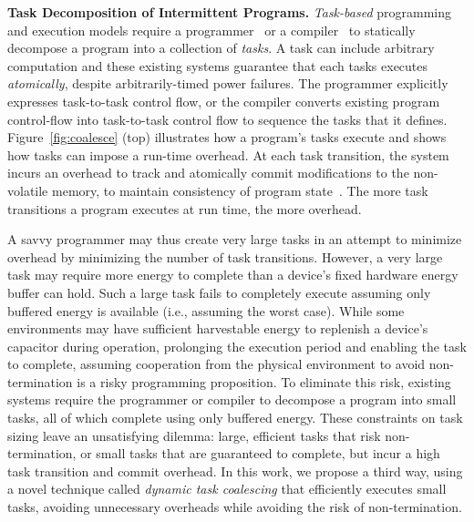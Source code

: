 \textbf{Task Decomposition of Intermittent Programs.} {\em
Task-based} programming and execution models require a
programmer~\citep{alpaca,chain} or a compiler~\cite{baghsorkhi_cgo_2018} to
statically decompose a program into a collection of {\em tasks}.  A task can
include arbitrary computation and these existing systems guarantee that each
tasks executes {\em atomically}, despite arbitrarily-timed power failures.  
%
The programmer explicitly expresses task-to-task control flow, or the compiler
converts existing program control-flow into task-to-task control flow to sequence 
the tasks that it defines.
%
Figure~\ref{fig:coalesce} (top) illustrates how a program's tasks execute and
shows how tasks can impose a run-time overhead. 
%
At each task transition, the system incurs an overhead to track and atomically
commit modifications to the non-volatile memory, to maintain consistency of
program state~\citep{chain,alpaca}.  
%
The more task transitions a program executes at run time, the more overhead.

A savvy programmer may thus create very large tasks in an attempt to minimize
overhead by minimizing the number of task transitions.  However, a very large
task may require more energy to complete than a device's fixed hardware energy
buffer can hold.  Such a large task fails to completely execute assuming only
buffered energy is available (i.e., assuming the worst case).  While some
environments may have sufficient harvestable energy to replenish a device's
capacitor during operation, prolonging the execution period and enabling the
task to complete, assuming cooperation from the physical environment to avoid
non-termination is a risky programming proposition.  To eliminate this risk,
existing systems require the programmer or compiler to decompose a  program
into small tasks, all of which complete using only buffered energy.  These
constraints on task sizing leave an unsatisfying dilemma: large, efficient
tasks that risk non-termination, or small tasks that are guaranteed to
complete, but incur a high task transition and commit overhead.  In this work,
we propose a third way, using a novel technique called {\em dynamic task
coalescing} that efficiently executes small tasks, avoiding unnecessary
overheads while avoiding the risk of non-termination.

